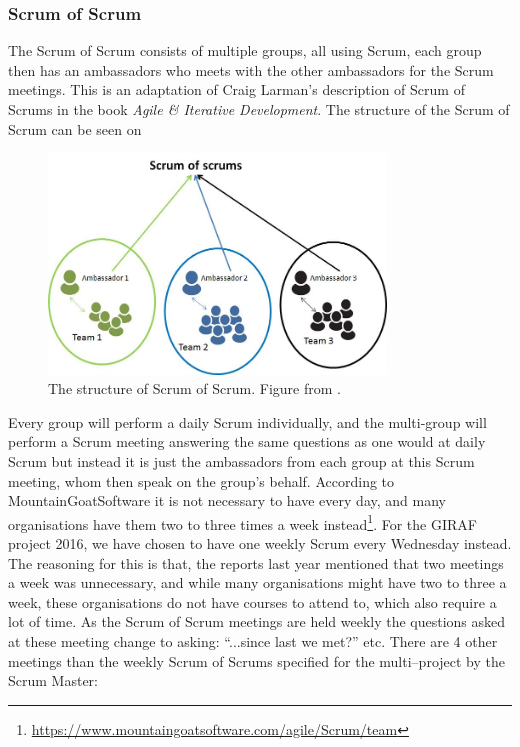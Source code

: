 \subsubsection{Scrum of Scrum}
The Scrum of Scrum consists of multiple groups, all using Scrum, each group then has an ambassadors who meets with the other ambassadors for the Scrum meetings.
This is an adaptation of Craig Larman's description of Scrum of Scrums in the book \textit{Agile \& Iterative Development}\cite{ScrumBOOK}.
The structure of the Scrum of Scrum can be seen on 

\begin{figure}[!htb]
\centering
\includegraphics[width=0.8\textwidth]{figures/ScrumofScrum.png}
\caption{The structure of Scrum of Scrum. Figure from \cite{ScrumofScrumfigure}.}
\label{fig:ScrumofScrum}
\end{figure}

Every group will perform a daily Scrum individually, and the multi-group will perform a Scrum meeting answering the same questions as one would at daily Scrum but instead it is just the ambassadors from each group at this Scrum meeting, whom then speak on the group's behalf.
According to MountainGoatSoftware it is not necessary to have every day, and many organisations have them two to three times a week instead\footnote{\url{https://www.mountaingoatsoftware.com/agile/Scrum/team}}.
For the GIRAF project 2016, we have chosen to have one weekly Scrum every Wednesday instead.
The reasoning for this is that, the reports last year mentioned that two meetings a week was unnecessary, and while many organisations might have two to three a week, these organisations do not have courses to attend to, which also require a lot of time.
As the Scrum of Scrum meetings are held weekly the questions asked at these meeting change to asking: \enquote{...since last we met?} etc.
There are 4 other meetings than the weekly Scrum of Scrums specified for the multi--project by the Scrum Master:

